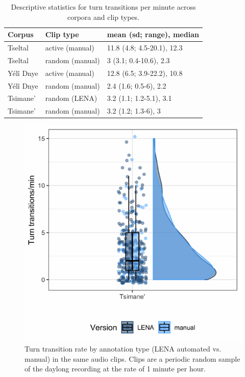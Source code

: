 \documentclass[10pt, letterpaper]{article}
\newenvironment{CodeChunk}{}{}
\begin{document}
\begin{table}[h]
\centering
\begin{tabular}{lll}
  \hline
Corpus & Clip type & mean (sd; range), median \\ 
  \hline
Tseltal & active (manual) & 11.8 (4.8; 4.5-20.1), 12.3 \\ 
  Tseltal & random (manual) & 3 (3.1; 0.4-10.6), 2.3 \\ 
  Yélî Dnye & active (manual) & 12.8 (6.5; 3.9-22.2), 10.8 \\ 
  Yélî Dnye & random (manual) & 2.4 (1.6; 0.5-6), 2.2 \\ 
  Tsimane' & random (LENA) & 3.2 (1.1; 1.2-5.1), 3.1 \\ 
  Tsimane' & random (manual) & 3.2 (1.2; 1.3-6), 3 \\ 
   \hline
\end{tabular}
\caption{Descriptive statistics for turn transitions per minute across corpora and clip types.} 
\end{table}

\begin{CodeChunk}
\begin{figure}[h]

{\centering \includegraphics{figs/tsi.ttr.fig-1} 

}

\caption[Turn transition rate by annotation type (LENA automated vs]{Turn transition rate by annotation type (LENA automated vs. manual) in the same audio clips. Clips are a periodic random sample of the daylong recording at the rate of 1 minute per hour.}\label{fig:tsi.ttr.fig}
\end{figure}
\end{CodeChunk}
\end{document}
